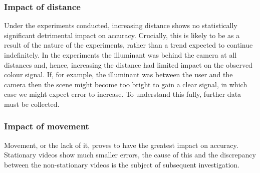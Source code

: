 \subsubsection{Impact of distance}
Under the experiments conducted, increasing distance shows no statistically significant detrimental impact on accuracy.
Crucially, this is likely to be as a result of the nature of the experiments, rather than a trend expected to continue indefinitely.
In the experiments the illuminant was behind the camera at all distances and, hence, increasing the distance had limited impact on the observed colour signal.
If, for example, the illuminant was between the user and the camera then the scene might become too bright to gain a clear signal, in which case we might expect error to increase.
To understand this fully, further data must be collected.
\begin{figure}[H]
    \centering
\end{figure}

\subsubsection{Impact of movement}
Movement, or the lack of it, proves to have the greatest impact on accuracy. Stationary videos show much smaller errors, the cause of this and the discrepancy between
the non-stationary videos is the subject of subsequent investigation.
\begin{figure}[H]
    \centering
    \label{fig:move_err}
\end{figure}

